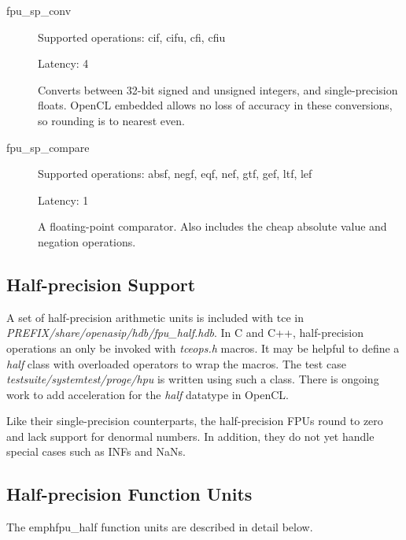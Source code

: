 \documentclass[a4paper,twoside]{tceusermanual}
\begin{document}
\begin{description}
\item[fpu\_sp\_conv]

Supported operations:         cif, cifu, cfi, cfiu

Latency:             4

Converts between 32-bit signed and unsigned integers, and single-precision floats. OpenCL embedded allows no loss of accuracy in these conversions, so rounding is to nearest even.

\item[fpu\_sp\_compare]

Supported operations:         absf, negf, eqf, nef, gtf, gef, ltf, lef

Latency:             1

A floating-point comparator. Also includes the cheap absolute value and negation operations.


\end{description}

\subsection{Half-precision Support}

A set of half-precision arithmetic units is included with tce in \emph{PREFIX/share/openasip/hdb/fpu\_half.hdb}. In C and C++,
half-precision operations an only be invoked with \emph{tceops.h} macros. It may be helpful to define a \emph{half}
class with overloaded operators to wrap the macros. The test case \emph{testsuite/systemtest/proge/hpu} is written
using such a class. There is ongoing work to add acceleration for the \emph{half} datatype in OpenCL.

Like their single-precision counterparts, the half-precision FPUs round to zero and lack support for denormal numbers.
In addition, they do not yet handle special cases such as INFs and NaNs.

\subsection{Half-precision Function Units}

The emph{fpu\_half} function units are described in detail below.
\end{document}
